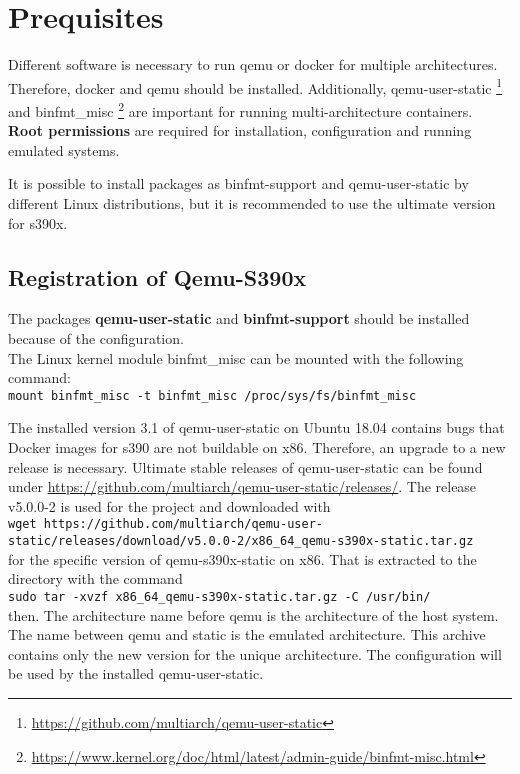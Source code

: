 \chapter{Prequisites}\label{ch:prequisites}


Different software is necessary to run qemu or docker for multiple architectures. Therefore, docker and qemu should be installed. Additionally, qemu-user-static \footnote{\url{https://github.com/multiarch/qemu-user-static}} and binfmt\_misc \footnote{\url{https://www.kernel.org/doc/html/latest/admin-guide/binfmt-misc.html}} are important for running multi-architecture containers. \\
\textbf{Root permissions} are required for installation, configuration and running emulated systems.

It is possible to install packages as binfmt-support and qemu-user-static by different Linux distributions, but it is recommended to use the ultimate version for s390x. \\

\section{Registration of Qemu-S390x}\label{Qemu-S390-Registration}

The packages \textbf{qemu-user-static} and \textbf{binfmt-support} should be installed because of the configuration. \\

The Linux kernel module binfmt\_misc can be mounted with the following command: \\
\lstinline!mount binfmt_misc -t binfmt_misc /proc/sys/fs/binfmt_misc!

The installed version 3.1 of qemu-user-static on Ubuntu 18.04 contains bugs that Docker images for s390 are not buildable on x86. Therefore, an upgrade to a new release is necessary.
Ultimate stable releases of qemu-user-static can be found under \url{https://github.com/multiarch/qemu-user-static/releases/}. The release v5.0.0-2 is used for the project and downloaded with \\
\lstinline!wget https://github.com/multiarch/qemu-user-static/releases/download/v5.0.0-2/x86_64_qemu-s390x-static.tar.gz! \\ 
for the specific version of qemu-s390x-static on x86. That is extracted to the directory  with the command \\ 
\lstinline!sudo tar -xvzf x86_64_qemu-s390x-static.tar.gz -C /usr/bin/! \\
then. The architecture name before qemu is the architecture of the host system. The name between qemu and static is the emulated architecture. This archive contains only the new version for the unique architecture. The configuration will be used by the installed qemu-user-static.\\

